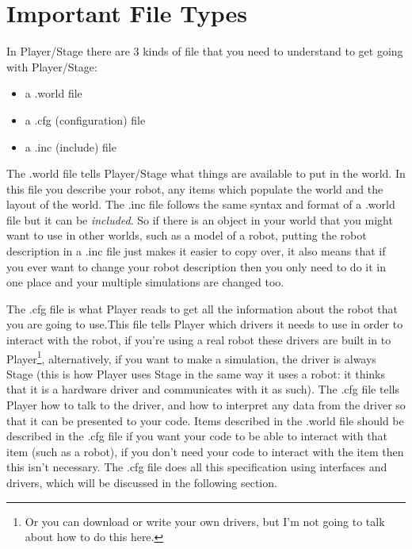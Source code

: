 \documentclass[a4paper]{report}
\newcommand{\plst}{Player/Stage\xspace}
\newcommand{\pl}{Player\xspace}
\begin{document}
\section{Important File Types}
In \plst there are 3 kinds of file that you need to understand to get going with \plst:
\begin{itemize}
	\item a .world file
	\item a .cfg (configuration) file
	\item a .inc (include) file
\end{itemize}
The .world file tells \plst what things are available to put in the world. In this file you describe your robot, any items which populate the world and the layout of the world. The .inc file follows the same syntax and format of a .world file but it can be \emph{included}. So if there is an object in your world that you might want to use in other worlds, such as a model of a robot, putting the robot description in a .inc file just makes it easier to copy over, it also means that if you ever want to change your robot description then you only need to do it in one place and your multiple simulations are changed too.

The .cfg file is what \pl reads to get all the information about the robot that you are going to use.This file tells \pl which drivers it needs to use in order to interact with the robot, if you're using a real robot these drivers are built in to \pl\footnote{Or you can download or write your own drivers, but I'm not going to talk about how to do this here.}, alternatively, if you want to make a simulation, the driver is always Stage (this is how \pl uses Stage in the same way it uses a robot: it thinks that it is a hardware driver and communicates with it as such). The .cfg file tells \pl how to talk to the driver, and how to interpret any data from the driver so that it can be presented to your code. Items described in the .world file should be described in the .cfg file if you want your code to be able to interact with that item (such as a robot), if you don't need your code to interact with the item then this isn't necessary. The .cfg file does all this specification using interfaces and drivers, which will be discussed in the following section.
\end{document}
